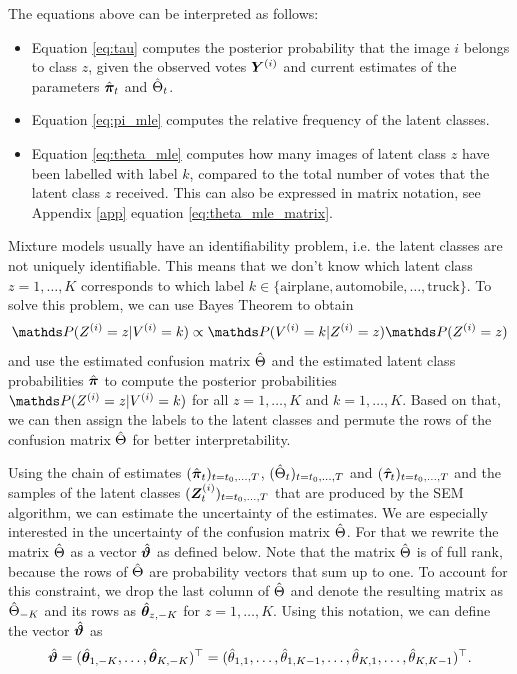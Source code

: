 The equations above can be interpreted as follows: 
\begin{itemize}
    \item Equation \ref{eq:tau} computes the posterior probability that
    the image $i$ belongs to class $z$, given the observed votes $\bm{Y}^{(i)}$ and
    current estimates of the parameters $\hat{\bm{\pi}}_t$ and $\hat{\Theta}_t$.
    \item Equation \ref{eq:pi_mle} computes the relative frequency of the latent
    classes.
    \item Equation \ref{eq:theta_mle} computes how many images of latent class
    $z$ have been labelled with label $k$, compared to the total number of votes
    that the latent class $z$ received. This can also be expressed in matrix
    notation, see Appendix \ref{app} equation \ref{eq:theta_mle_matrix}.
\end{itemize}

Mixture models usually have an identifiability problem, i.e. the latent classes
are not uniquely identifiable. This means that we don't know which latent class
$z = 1,\dots,K$ corresponds to which label $k \in \{\text{airplane},
\text{automobile}, \dots, \text{truck}\}$. To solve this problem, we can use Bayes
Theorem to obtain $$\P(Z^{(i)} = z| V^{(i)} = k) \propto \P(V^{(i)} = k| Z^{(i)} = z)
\P(Z^{(i)} = z)$$ and use the estimated confusion matrix $\hat{\Theta}$ and the
estimated latent class probabilities $\hat{\bm{\pi}}$ to compute the posterior
probabilities $\P(Z^{(i)} = z| V^{(i)} = k)$ for all $z = 1,\dots,K$ and $k =
1,\dots,K$. Based on that, we can then assign the labels to the latent classes
and permute the rows of the confusion matrix $\hat{\Theta}$ for better interpretability.\bigskip



Using the chain of estimates $(\hat{\bm{\pi}}_t)_{t = t_0,\dots,T}$, $(\hat{\Theta}_t)_{t =
t_0,\dots,T}$ and $(\hat{\bm{\tau}}_t)_{t = t_0,\dots,T}$ and the samples of the latent
classes $(\bm{Z}_t^{(i)})_{t = t_0,\dots,T}$ that are produced by the SEM
algorithm, we can estimate the uncertainty of the estimates. We are especially
interested in the uncertainty of the confusion matrix $\hat{\Theta}$. For that we
rewrite the matrix $\hat{\Theta}$ as a vector $\hat{\bm{\vartheta}}$ as defined below. Note
that the matrix $\hat{\Theta}$ is of full rank, because the rows of $\hat{\Theta}$ are
probability vectors that sum up to one. To account for this constraint, we
drop the last column of $\hat{\Theta}$ and denote the resulting matrix as $\hat{\Theta}_{-K}$
and its rows as $\hat{\bm{\theta}}_{z, -K}$ for $z = 1,\dots,K$. Using this notation, we
can define the vector $\hat{\bm{\vartheta}}$ as
\begin{equation}
    \hat{\bm{\vartheta}} = (\hat{\bm{\theta}}_{1, -K}, \ldots, \hat{\bm{\theta}}_{K, -K})^\top = (\hat{\theta}_{1, 1}, \ldots, \hat{\theta}_{1, K-1}, \ldots, \hat{\theta}_{K, 1}, \ldots, \hat{\theta}_{K, K-1})^\top.
\end{equation}

